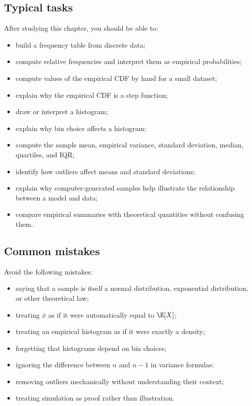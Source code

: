 \subsection*{Typical tasks}

After studying this chapter, you should be able to:
\begin{itemize}
    \item build a frequency table from discrete data;
    \item compute relative frequencies and interpret them as empirical
    probabilities;
    \item compute values of the empirical CDF by hand for a small dataset;
    \item explain why the empirical CDF is a step function;
    \item draw or interpret a histogram;
    \item explain why bin choice affects a histogram;
    \item compute the sample mean, empirical variance, standard deviation,
    median, quartiles, and IQR;
    \item identify how outliers affect means and standard deviations;
    \item explain why computer-generated samples help illustrate the relationship
    between a model and data;
    \item compare empirical summaries with theoretical quantities without
    confusing them.
\end{itemize}

\subsection*{Common mistakes}

Avoid the following mistakes:
\begin{itemize}
    \item saying that a sample is itself a normal distribution, exponential
    distribution, or other theoretical law;
    \item treating \(\bar{x}\) as if it were automatically equal to \(\E[X]\);
    \item treating an empirical histogram as if it were exactly a density;
    \item forgetting that histograms depend on bin choices;
    \item ignoring the difference between \(n\) and \(n-1\) in variance formulas;
    \item removing outliers mechanically without understanding their context;
    \item treating simulation as proof rather than illustration.
\end{itemize}

